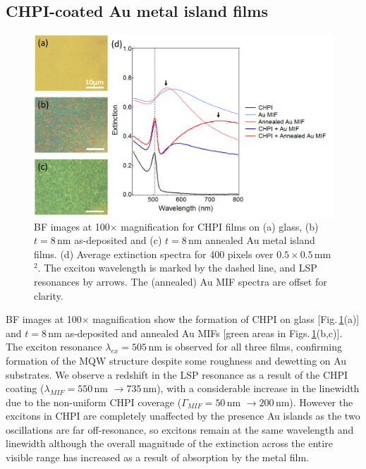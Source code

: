 \subsection{CHPI-coated Au metal island films}
\begin{figure}[h!] 
\centering    
\includegraphics[width=\textwidth]{Fig3}
\caption{BF images at 100$\times$ magnification for CHPI films on (a) glass, (b) $t=8$\,nm as-deposited and (c) $t=8$\,nm annealed Au metal island films. (d) Average extinction spectra for 400 pixels over $0.5\times0.5$\,mm$^2$. The exciton wavelength is marked by the dashed line, and LSP resonances by arrows. The (annealed) Au MIF spectra are offset for clarity.}
\label{6Fig3}
\end{figure}
BF images at 100$\times$ magnification show the formation of CHPI on glass [Fig.\,\ref{6Fig3}(a)] and $t=8$\,nm as-deposited and annealed Au MIFs [green areas in Figs.\,\ref{6Fig3}(b,c)]. The exciton resonance $\lambda_{ex} = 505$\,nm is observed for all three films, confirming formation of the MQW structure despite some roughness and dewetting on Au substrates. We observe a redshift in the LSP resonance as a result of the CHPI coating ($\lambda_{MIF} = 550$\,nm $\rightarrow 735$\,nm), with a considerable increase in the linewidth due to the non-uniform CHPI coverage ($\Gamma_{MIF} = 50$\,nm $\rightarrow 200$\,nm). However the excitons in CHPI are completely unaffected by the presence Au islands as the two oscillations are far off-resonance, so excitons remain at the same wavelength and linewidth although the overall magnitude of the extinction across the entire visible range has increased as a result of absorption by the metal film.

